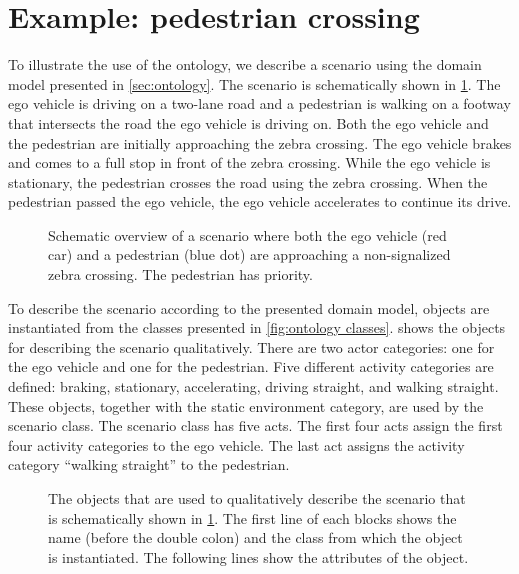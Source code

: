 \cbstart
\section{Example: pedestrian crossing}
\label{sec:example}

To illustrate the use of the ontology, we describe a scenario using the domain model presented in \cref{sec:ontology}. The scenario is schematically shown in \cref{fig:scenario overview}. The ego vehicle is driving on a two-lane road and a pedestrian is walking on a footway that intersects the road the ego vehicle is driving on. Both the ego vehicle and the pedestrian are initially approaching the zebra crossing. The ego vehicle brakes and comes to a full stop in front of the zebra crossing. While the ego vehicle is stationary, the pedestrian crosses the road using the zebra crossing. When the pedestrian passed the ego vehicle, the ego vehicle accelerates to continue its drive.
\cbend

\setlength{\figurewidth}{\linewidth}
\begin{figure}
	\centering
	
	\caption{\cbstart Schematic overview of a scenario where both the ego vehicle (red car) and a pedestrian (blue dot) are approaching a non-signalized zebra crossing. The pedestrian has priority. \cbend}
	\label{fig:scenario overview}
\end{figure}

\cbstart
To describe the scenario according to the presented domain model, objects are instantiated from the classes presented in \cref{fig:ontology classes}.  shows the objects for describing the scenario qualitatively. There are two actor categories: one for the ego vehicle and one for the pedestrian. Five different activity categories are defined: braking, stationary, accelerating, driving straight, and walking straight. These objects, together with the static environment category, are used by the scenario class. The scenario class has five acts. The first four acts assign the first four activity categories to the ego vehicle. The last act assigns the activity category ``walking straight'' to the pedestrian.
\cbend

\begin{figure}
	\centering
	
	\caption{\cbstart The objects that are used to qualitatively describe the scenario that is schematically shown in \cref{fig:scenario overview}. The first line of each blocks shows the name (before the double colon) and the class from which the object is instantiated. The following lines show the attributes of the object.\cbend}
	\label{fig:example qualitative}
\end{figure}


